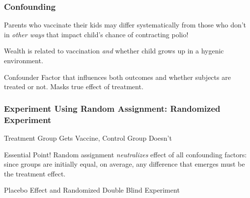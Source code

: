 \begin{frame}
\frametitle{Confounding}
	Parents who vaccinate their kids may differ systematically from those who don't in \emph{other ways} that impact child's chance of contracting polio!
	
	\vspace{2em}
	\begin{alertblock}{Wealth is related to vaccination \emph{and} whether child grows up in a hygenic environment.}
	\end{alertblock}

  \begin{block}{Confounder}
Factor that influences both outcomes and whether subjects are treated or not. Masks true effect of treatment.
  \end{block}
\end{frame}
\begin{frame}

\frametitle{Experiment Using Random Assignment: Randomized Experiment}
Treatment Group Gets Vaccine, Control Group Doesn't

\begin{block}{Essential Point!}
Random assignment \emph{neutralizes} effect of all confounding factors: since groups are initially equal, on average, any difference that emerges must be the treatment effect.
\end{block}

\begin{block}{Placebo Effect and Randomized Double Blind Experiment}
\end{block}
\end{frame}


